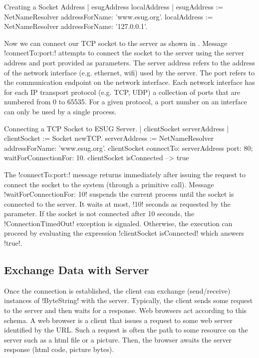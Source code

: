 \documentclass[a4paper,10pt,twoside]{book}
\begin{document}

\begin{script}[creatingSocketAddress]{Creating a Socket Address}
| esugAddress localAddress |
esugAddress := NetNameResolver addressForName: 'www.esug.org'.
localAddress := NetNameResolver addressForName: '127.0.0.1'.
\end{script}

Now we can connect our TCP socket to the server as shown in .
Message \ct!connectTo:port:! attempts to connect the socket to the server using the server address and port provided as parameters.
The server address refers to the address of the network interface (e.g. ethernet, wifi) used by the server.
The port refers to the communication endpoint on the network interface. 
Each network interface has for each IP transport protocol (e.g. TCP, UDP) a collection of ports that are numbered from 0 to 65535.
For a given protocol, a port number on an interface can only be used by a single process.

\begin{script}[connectingTcpSocket]{Connecting a TCP Socket to ESUG Server.}
| clientSocket serverAddress |
clientSocket := Socket newTCP.
serverAddress := NetNameResolver addressForName: 'www.esug.org'.
clientSocket 
	connectTo: serverAddress port: 80;
	waitForConnectionFor: 10.
clientSocket isConnected
--> true
\end{script}

The \ct!connectTo:port:!  message returns immediately after issuing the request to connect the socket to the system (through a primitive call).
Message \ct!waitForConnectionFor: 10! suspends the current process until the socket is connected to the server.
It waits at most, \ct!10! seconds as requested by the parameter.
If the socket is not connected after 10 seconds, the \ct!ConnectionTimedOut! exception is signaled. 
Otherwise, the execution can proceed by evaluating the expression \ct!clientSocket isConnected! which answers \ct!true!.



\subsection{Exchange Data with Server}
\label{sec:exchangeData}
Once the connection is established, the client can exchange (send/receive) instances of \ct!ByteString! with the server.
Typically, the client sends some request to the server and then waits for a response.
Web browsers act according to this schema.
A web browser is a client that issues a request to some web server identified by the URL.
Such a request is often the path to some resource on the server such as a html file or a picture.
Then, the browser awaits the server response (\eg html code, picture bytes).
\end{document}
